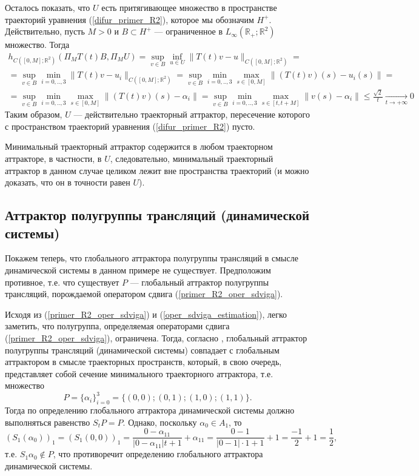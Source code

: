 Осталось показать, что $U$ есть притягивающее множество в пространстве траекторий уравнения (\ref{difur_primer_R2}),
которое мы обозначим $H^+$.
Действительно, пусть $M>0$ и $B\subset H^+$ --- ограниченное в $L_\infty(\mathbb{R}_+; \mathbb{R}^2)$ множество.
Тогда
\begin{multline*}
	h_{C([0,M];\mathbb{R}^2)}(\Pi_M T(t)B,\Pi_M U) =
	\sup_{v\in B} \inf_{u\in U} \| T(t) v - u \|_{C([0,M];\mathbb{R}^2)} =
	\\ =
	\sup_{v\in B} \min_{i=0,..,3} \| T(t) v - u_i \|_{C([0,M];\mathbb{R}^2)} =
	\sup_{v\in B} \min_{i=0,..,3} \max_{s\in[0,M]} \| (T(t) v)(s) - u_i(s) \| =
	\\ =
	\sup_{v\in B} \min_{i=0,..,3} \max_{s\in[0,M]} \| (T(t) v)(s) - \alpha_i \| =
	\sup_{v\in B} \min_{i=0,..,3} \max_{s\in[t,t+M]} \| v(s) - \alpha_i \| \leq
	\frac{\sqrt{2}}{t} \xrightarrow[t\to + \infty]{} 0
\end{multline*}
Таким образом, $U$ --- действительно траекторный аттрактор, пересечение которого с пространством траекторий
уравнения (\ref{difur_primer_R2}) пусто.

Минимальный траекторный аттрактор содержится в любом траекторном аттракторе, в частности, в $U$,
следовательно, минимальный траекторный аттрактор в данном случае целиком лежит вне пространства траекторий
(и можно доказать, что он в точности равен $U$).

\subsection{Аттрактор полугруппы трансляций (динамической системы)}

Покажем теперь, что глобального аттрактора полугруппы трансляций
в смысле динамической системы в данном примере не существует.
Предположим противное, т.е. что существует $P$ --- глобальный аттрактор полугруппы трансляций,
порождаемой оператором сдвига (\ref{primer_R2_oper_sdviga}).

Исходя из (\ref{primer_R2_oper_sdviga}) и (\ref{oper_sdviga_estimation}), легко заметить, что полугруппа, определяемая операторами сдвига (\ref{primer_R2_oper_sdviga}), ограничена.
Тогда, согласно  \cite[corollary 4.2.4]{Vorotnikov}, глобальный аттрактор полугруппы трансляций (динамической системы) совпадает с глобальным аттрактором в смысле траекторных пространств, который, в свою очередь, представляет собой сечение минимального траекторного аттрактора, т.е. множество
$$
	P = \{\alpha_i\}_{i=0}^3 = \{(0,0); (0,1); (1,0); (1,1)\}.
$$
Тогда по определению глобального аттрактора динамической системы должно выполняться равенство $S_t P = P$.
Однако, поскольку $\alpha_0 \in A_1$, то
$$
	(S_1(\alpha_0))_1 = (S_1(0,0))_1 =
	\frac{0-\alpha_{11}}{|0-\alpha_{11}|t+1}+\alpha_{11} =
	\frac{0-1}{|0-1|\cdot 1 +1}+1 = \frac{-1}{2} + 1 = \frac{1}{2},
$$
т.е. $S_1 \alpha_0 \notin P$, что противоречит определению глобального аттрактора динамической системы.

